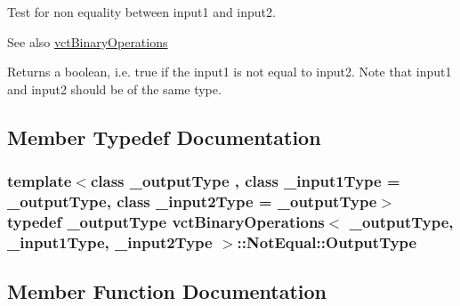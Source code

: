 Test for non equality between input1 and input2. 

\begin{DoxySeeAlso}{See also}
\hyperlink{classvct_binary_operations}{vct\+Binary\+Operations}
\end{DoxySeeAlso}
Returns a boolean, i.\+e. true if the input1 is not equal to input2. Note that input1 and input2 should be of the same type. 

\subsection{Member Typedef Documentation}
\hypertarget{classvct_binary_operations_1_1_not_equal_a3abb820f974d81c4302dda44cbc5c98b}{}
\subsubsection[{Output\+Type}]{\setlength{\rightskip}{0pt plus 5cm}template$<$class \+\_\+output\+Type , class \+\_\+input1\+Type  = \+\_\+output\+Type, class \+\_\+input2\+Type  = \+\_\+output\+Type$>$ typedef \+\_\+output\+Type {\bf vct\+Binary\+Operations}$<$ \+\_\+output\+Type, \+\_\+input1\+Type, \+\_\+input2\+Type $>$\+::{\bf Not\+Equal\+::\+Output\+Type}}\label{classvct_binary_operations_1_1_not_equal_a3abb820f974d81c4302dda44cbc5c98b}


\subsection{Member Function Documentation}
\hypertarget{classvct_binary_operations_1_1_not_equal_a1f77296d252779891e79a67128bedc5b}{}

